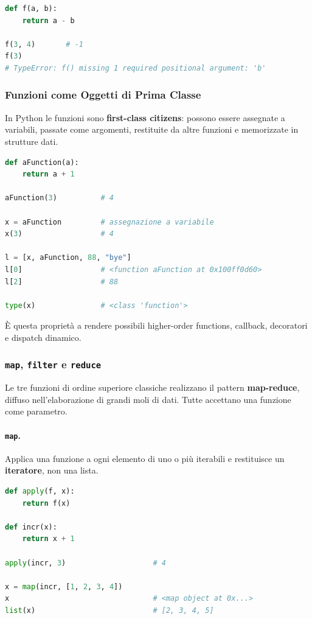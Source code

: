 \documentclass[12pt]{extarticle}
\begin{document}
\begin{lstlisting}[language=Python]
def f(a, b):
    return a - b

f(3, 4)       # -1
f(3)
# TypeError: f() missing 1 required positional argument: 'b'
\end{lstlisting}

\subsubsection{Funzioni come Oggetti di Prima Classe}

\noindent In Python le funzioni sono \textbf{first-class citizens}: possono essere assegnate a variabili, passate come argomenti, restituite da altre funzioni e memorizzate in strutture dati.

\begin{lstlisting}[language=Python]
def aFunction(a):
    return a + 1

aFunction(3)          # 4

x = aFunction         # assegnazione a variabile
x(3)                  # 4

l = [x, aFunction, 88, "bye"]
l[0]                  # <function aFunction at 0x100ff0d60>
l[2]                  # 88

type(x)               # <class 'function'>
\end{lstlisting}

\noindent È questa proprietà a rendere possibili higher-order functions, callback, decoratori e dispatch dinamico.

\subsubsection{\texttt{map}, \texttt{filter} e \texttt{reduce}}

\noindent Le tre funzioni di ordine superiore classiche realizzano il pattern \textbf{map-reduce}, diffuso nell'elaborazione di grandi moli di dati. Tutte accettano una funzione come parametro.

\paragraph{\texttt{map}.} Applica una funzione a ogni elemento di uno o più iterabili e restituisce un \textbf{iteratore}, non una lista.

\begin{lstlisting}[language=Python]
def apply(f, x):
    return f(x)

def incr(x):
    return x + 1

apply(incr, 3)                    # 4

x = map(incr, [1, 2, 3, 4])
x                                 # <map object at 0x...>
list(x)                           # [2, 3, 4, 5]
\end{lstlisting}
\end{document}
